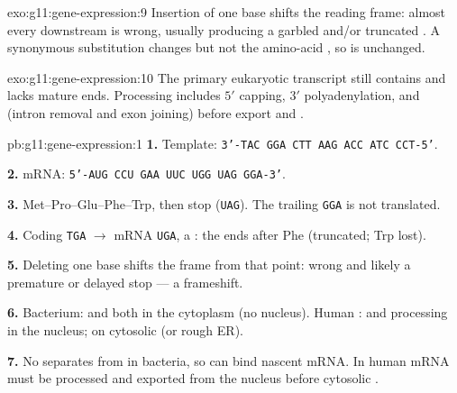 \begin{solution}{exo:g11:gene-expression:9}
Insertion of one base shifts the reading frame: almost every  downstream
is wrong, usually producing a garbled and/or truncated . A synonymous
substitution changes  but not the amino-acid , so 
is unchanged.
\end{solution}

\begin{solution}{exo:g11:gene-expression:10}
The primary eukaryotic transcript still contains  and lacks mature ends.
Processing includes $5'$ capping, $3'$ polyadenylation, and  (intron
removal and exon joining) before export and .
\end{solution}

\begin{solution}{pb:g11:gene-expression:1}
\textbf{1.} Template: \texttt{3'-TAC GGA CTT AAG ACC ATC CCT-5'}.

\textbf{2.} mRNA: \texttt{5'-AUG CCU GAA UUC UGG UAG GGA-3'}.

\textbf{3.} Met--Pro--Glu--Phe--Trp, then stop (\texttt{UAG}). The trailing
\texttt{GGA} is not translated.

\textbf{4.} Coding \texttt{TGA} $\to$ mRNA \texttt{UGA}, a : the
 ends after Phe (truncated; Trp lost).

\textbf{5.} Deleting one base shifts the frame from that point: wrong  and likely a premature or delayed stop --- a frameshift.

\textbf{6.} Bacterium:  and  both in the cytoplasm (no
nucleus). Human :  and processing in the nucleus; 
on cytosolic  (or rough ER).

\textbf{7.} No  separates  from  in bacteria, so
 can bind nascent mRNA. In human  mRNA must be processed and
exported from the nucleus before cytosolic .
\end{solution}
